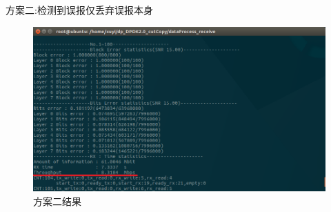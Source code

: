 \documentclass{article}
\begin{document}
\newpage
方案二:检测到误报仅丢弃误报本身\\
\begin{figure}[H]
	\centering
	\includegraphics[width = .8\textwidth]{result_throughput.png}
	\caption{方案二结果}
\end{figure}

\end{document}
